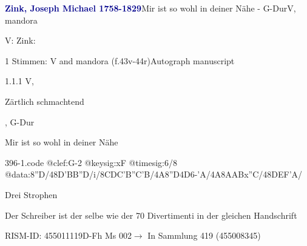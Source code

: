 \documentclass[twocolumn, 12pt]{book}
\begin{document}
\par \vspace{16pt} \textcolor{darkblue}{\textbf{Zink, Joseph Michael  1758-1829}}\hfillplus{\textbf{[396]}}\newline Mir ist so wohl in deiner Nähe - G-Dur\newline V, mandora
\par \begin{itshape}[at left, f.43v:] V: Zink:\end{itshape} 
\par \textcolor{darkblue}{}  1 Stimmen: V and mandora  (f.43v-44r)\newline Autograph manuscript
\par 1.1.1  V, \begin{itshape}Zärtlich schmachtend\end{itshape}, G-Dur\newline \begin{footnotesize} Mir ist so wohl in deiner Nähe \end{footnotesize}  
\begin{filecontents*}{396-1.code}
@clef:G-2
@keysig:xF
@timesig:6/8
@data:8''D/48D'BB''D/i/{8CD}C{'B''C}'B/4A8''D4D6-'A/4A8A{AB}x''C/48DEF'A/
\end{filecontents*}
\newline %
\par Drei Strophen
\par Der Schreiber ist der selbe wie der 70 Divertimenti in der gleichen Handschrift
\par RISM-ID: 455011119\newline D-Fh  Ms 002\newline $\rightarrow$ In Sammlung 419 (455008345)
      
\end{document}
